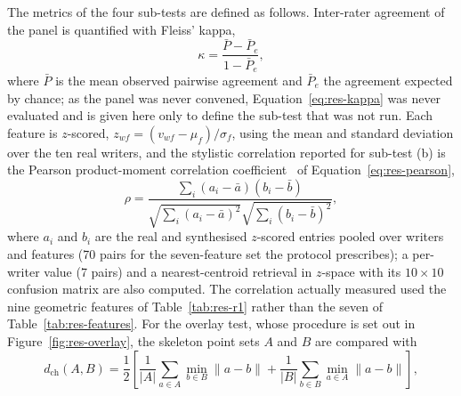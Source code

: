             The metrics of the four sub-tests are defined as follows.
            Inter-rater agreement of the panel is quantified with Fleiss' kappa,
            \begin{equation}
            \label{eq:res-kappa}
            \kappa=\frac{\bar P-\bar P_e}{1-\bar P_e},
            \end{equation}
            where $\bar P$ is the mean observed pairwise agreement and $\bar P_e$ the agreement expected by chance; as the panel was never convened, Equation~\ref{eq:res-kappa} was never evaluated and is given here only to define the sub-test that was not run.
            Each feature is $z$-scored, $z_{wf}=(v_{wf}-\mu_f)/\sigma_f$, using the mean and standard deviation over the ten real writers, and the stylistic correlation reported for sub-test (b) is the Pearson product-moment correlation coefficient~\cite{pearson1896}  of Equation~\ref{eq:res-pearson},
            \begin{equation}
            \label{eq:res-pearson}
            \rho=\frac{\sum_{i}(a_i-\bar a)(b_i-\bar b)}{\sqrt{\sum_i(a_i-\bar a)^2}\sqrt{\sum_i(b_i-\bar b)^2}},
            \end{equation}
            where $a_i$ and $b_i$ are the real and synthesised $z$-scored entries pooled over writers and features (70 pairs for the seven-feature set the protocol prescribes); a per-writer value (7 pairs) and a nearest-centroid retrieval in $z$-space with its $10\times10$ confusion matrix are also computed.
            The correlation actually measured used the nine geometric features of Table~\ref{tab:res-r1} rather than the seven of Table~\ref{tab:res-features}.
            For the overlay test, whose procedure is set out in Figure~\ref{fig:res-overlay}, the skeleton point sets $A$ and $B$ are compared with
            \begin{equation}
            \label{eq:res-chamfer}
            d_{\mathrm{ch}}(A,B)=\frac{1}{2}\left[\frac{1}{\lvert A\rvert}\sum_{a\in A}\min_{b\in B}\lVert a-b\rVert+\frac{1}{\lvert B\rvert}\sum_{b\in B}\min_{a\in A}\lVert a-b\rVert\right],
            \end{equation}
